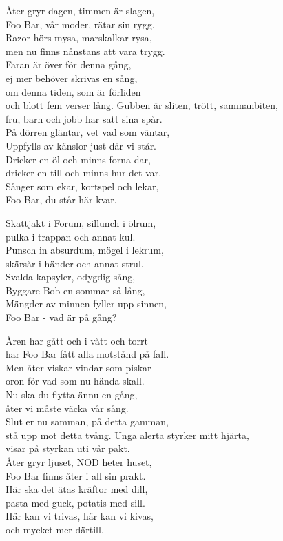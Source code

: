 Åter gryr dagen, timmen är slagen,\\
Foo Bar, vår moder, rätar sin rygg.\\
Razor hörs mysa, marskalkar rysa,\\
men nu finns nånstans att vara trygg.\\
Faran är över för denna gång,\\
ej mer behöver skrivas en sång,\\
om denna tiden, som är förliden\\
och blott fem verser lång.
\newpage
Gubben är sliten, trött, sammanbiten,\\
fru, barn och jobb har satt sina spår.\\
På dörren gläntar, vet vad som väntar,\\
Uppfylls av känslor just där vi står.\\
Dricker en öl och minns forna dar,\\
dricker en till och minns hur det var.\\
Sånger som ekar, kortspel och lekar,\\
Foo Bar, du står här kvar.

Skattjakt i Forum, sillunch i ölrum,\\
pulka i trappan och annat kul.\\
Punsch in absurdum, mögel i lekrum,\\
skärsår i händer och annat strul.\\
Svalda kapsyler, odygdig sång,\\
Byggare Bob en sommar så lång,\\
Mängder av minnen fyller upp sinnen,\\
Foo Bar - vad är på gång?

Åren har gått och i vått och torrt\\
har Foo Bar fått alla motstånd på fall.\\
Men åter viskar vindar som piskar\\
oron för vad som nu hända skall.\\
Nu ska du flytta ännu en gång,\\
åter vi måste väcka vår sång.\\
Slut er nu samman, på detta gamman,\\
stå upp mot detta tvång.
\newpage
Unga alerta styrker mitt hjärta,\\
visar på styrkan uti vår pakt.\\
Åter gryr ljuset, NOD heter huset,\\
Foo Bar finns åter i all sin prakt.\\
Här ska det ätas kräftor med dill,\\
pasta med guck, potatis med sill.\\
Här kan vi trivas, här kan vi kivas,\\
och mycket mer därtill.

